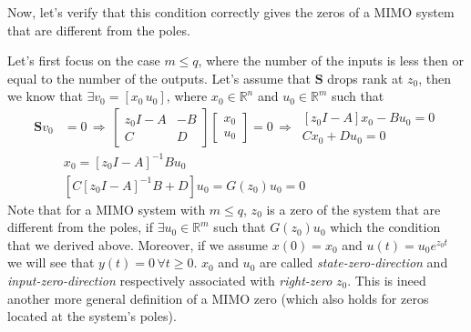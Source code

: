 \documentclass[twoside]{article}
\begin{document}
Now, let's verify that this condition correctly gives the zeros of a MIMO system that are different from the poles. 

Let's first focus on the case $m \leq q$, where the number of the inputs is less then or equal to the number of the outputs. 
Let's assume that  $\mathbf{S}$ drops rank at $z_0$, then we know that $\exists v_0 = [x_0 \, u_0]$, where $x_0 \in \mathbb{R}^{n}$ and $u_0 \in \mathbb{R}^m$ such that 
%
%
\begin{align*}
\mathbf{S} v_0 &= 0
\, \Rightarrow \,
\left[ \begin{array}{cc} z_0 I - A & -B \\ C & D \end{array} \right] \left[ \begin{array}{c} x_0 \\ u_0 \end{array} \right] = 0
\, \Rightarrow \,
 \begin{array}{cc} \left[ z_0 I - A \right] x_0 - B u_0 = 0 \\ C x_0 + D u_0 = 0 \end{array}
 \\
 &x_0 =  \left[ z_0 I - A \right]^{-1} B u_0 \\
&\left[ C \left[ z_0 I - A \right]^{-1} B  + D \right] u_0 = G(z_0) u_0 =  0 
\end{align*}
%
Note that for a MIMO system with $m \leq q$, $z_0$ is a zero of the system that are different from the poles, 
if $\exists u_0 \in \mathbb{R}^m$ such that $G(z_0) u_0 $ which the condition that we derived above. Moreover, if we 
assume $x(0) = x_0$ and $u(t) = u_0 e^{z_0 t}$ we will see that $y(t) = 0 \, \forall t \geq 0$. $x_0$ and $u_0$ are called \textit{state-zero-direction} and \textit{input-zero-direction} respectively associated with \textit{right-zero} $z_0$. This is ineed another more general definition of a MIMO zero (which also holds for zeros located at the system's poles).
\end{document}
